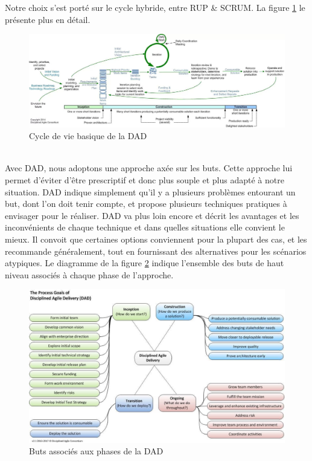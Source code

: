 \begin{spacing}{1.5}
Notre choix s'est porté sur le cycle hybride, entre RUP \& SCRUM. La figure \ref{fig:ScrumRUPcycleDAD} le présente plus en détail.

\begin{figure}[h]
\centering
\includegraphics[width=1\linewidth]{ScrumRUPcycleDAD.jpg}
\caption{Cycle de vie basique de la DAD}
\label{fig:ScrumRUPcycleDAD}
\end{figure}
\\
Avec DAD, nous adoptons une approche axée sur les buts. Cette approche lui permet d'éviter d'être prescriptif et donc plus souple et plus adapté à notre situation. DAD indique simplement qu'il y a plusieurs problèmes entourant un but, dont l'on doit tenir compte, et propose plusieurs techniques pratiques à envisager pour le réaliser. DAD va plus loin encore et décrit les avantages et les inconvénients de chaque technique et dans quelles situations elle convient le mieux. Il convoit que certaines options conviennent pour la plupart des cas, et les recommande généralement, tout en fournissant des alternatives pour les scénarios atypiques. Le diagramme de la figure \ref{fig:goalsDAD} indique l'ensemble des buts de haut niveau associés à chaque phase de l'approche.

\begin{figure}[h]
\centering
\includegraphics[width=0.95\linewidth]{goalsDAD.jpg}
\caption{Buts associés aux phases de la DAD}
\label{fig:goalsDAD}
\end{figure}


\end{spacing}
